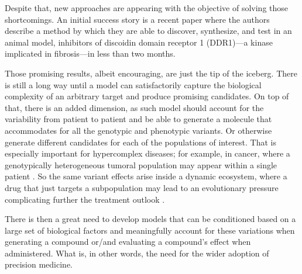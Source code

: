 \documentclass{article}
\begin{document}



Despite that, new approaches are appearing with the objective of solving those
 shortcomings. An initial success story is a recent paper \cite{Zhavoronkov2019} where
 the authors describe a method by which they are able to discover, synthesize, and test
 in an animal model, inhibitors of discoidin domain receptor 1 (DDR1)—a kinase
 implicated in fibrosis—in less than two months.


Those promising results, albeit encouraging, are just the tip of the iceberg. There is
still a long way until a model can satisfactorily capture the biological complexity of
an arbitrary target and produce promising candidates. On top of that, there is an added
dimension, as such model should account for the variability from patient to patient and
be able to generate a molecule that accommodates for all the genotypic and phenotypic
variants. Or otherwise generate different candidates for each of the populations of
interest. That is especially important for hypercomplex diseases; for example, in
cancer, where a genotypically heterogeneous tumoral population may appear within a
single patient \cite{Boland2017}. So the same variant effects arise inside a dynamic
ecosystem, where a drug that just targets a subpopulation may lead to an evolutionary
pressure complicating further the treatment outlook \cite{Enriquez-Navas2015}.

There is then a great need to develop models that can be conditioned based on a large
set of biological factors and meaningfully account for these variations when generating
a compound or/and evaluating a compound's effect when administered. What is, in other
words, the need for the wider adoption of precision medicine.
\end{document}
